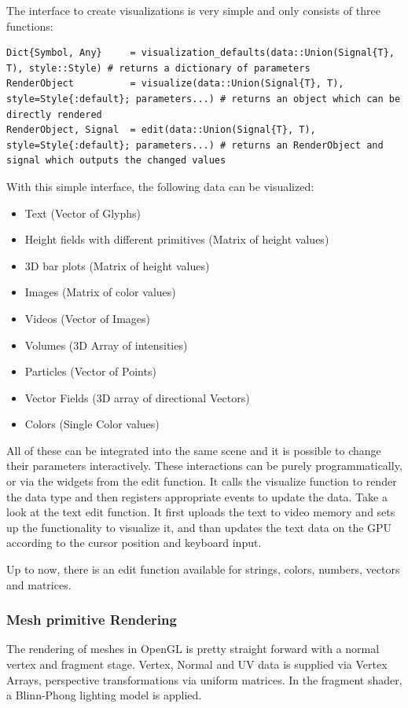 The interface to create visualizations is very simple and only consists of three functions:
\begin{lstlisting}
Dict{Symbol, Any}     = visualization_defaults(data::Union(Signal{T}, T), style::Style) # returns a dictionary of parameters
RenderObject 		  = visualize(data::Union(Signal{T}, T), style=Style{:default}; parameters...) # returns an object which can be directly rendered
RenderObject, Signal  = edit(data::Union(Signal{T}, T), style=Style{:default}; parameters...) # returns an RenderObject and signal which outputs the changed values
\end{lstlisting}

With this simple interface, the following data can be visualized:

\begin{itemize}
	\item Text (Vector of Glyphs)
	\item Height fields with different primitives (Matrix of height values)
	\item 3D bar plots (Matrix of height values)
	\item Images (Matrix of color values)
	\item Videos (Vector of Images)
	\item Volumes (3D Array of intensities)
	\item Particles (Vector of Points)
	\item Vector Fields (3D array of directional Vectors)
    \item Colors (Single Color values)
\end{itemize}

All of these can be integrated into the same scene and it is possible to change their parameters interactively.
These interactions can be purely programmatically, or via the widgets from the edit function.
It calls the visualize function to render the data type and then registers appropriate events to update the data.
Take a look at the text edit function.
It first uploads the text to video memory and sets up the functionality to visualize it, and than updates the text data on the GPU according to the cursor position and keyboard input.

Up to now, there is an edit function available for strings, colors, numbers, vectors and matrices.

\subsubsection{Mesh primitive Rendering}
The rendering of meshes in OpenGL is pretty straight forward with a normal vertex and fragment stage.
Vertex, Normal and UV data is supplied via Vertex Arrays, perspective transformations via uniform matrices.
In the fragment shader, a Blinn-Phong lighting model is applied.

